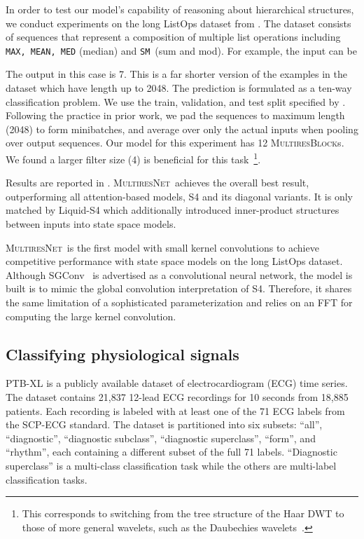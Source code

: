 \documentclass{article}
\theoremstyle{plain}
\theoremstyle{definition}
\theoremstyle{remark}
\newcommand{\ourmodel}{\textsc{MultiresNet}}
\begin{document}
In order to test our model's capability of reasoning about hierarchical structures, we conduct experiments on the long ListOps dataset from \citet{tay2021long}. 
The dataset consists of sequences that represent a composition of multiple list operations including \texttt{MAX, MEAN, MED} (median) and \texttt{SM}~(sum and mod). 
For example, the input can be

The output in this case is 7. 
This is a far shorter version of the examples in the dataset which have length up to 2048. 
The prediction is formulated as a ten-way classification problem. 
We use the train, validation, and test split specified by \citet{tay2021long}. 
Following the practice in prior work, we pad the sequences to maximum length (2048) to form minibatches, and average over only the actual inputs when pooling over output sequences. Our model for this experiment has 12 \textsc{MultiresBlock}s. 
We found a larger filter size (4) is beneficial for this task~\footnote{This corresponds to switching from the tree structure of the Haar DWT to those of more general wavelets, such as the Daubechies wavelets~\citep{akansu2001multiresolution}.}. 

Results are reported in . 
\ourmodel\ achieves the overall best result, outperforming all attention-based models, S4 and its diagonal variants. 
It is only matched by Liquid-S4 which additionally introduced inner-product structures between inputs into state space models. 

\ourmodel\ is the first model with small kernel convolutions to achieve competitive performance with state space models on the long ListOps dataset. 
Although SGConv~\citep{li2022makes} is advertised as a convolutional neural network, the model is built is to mimic the global convolution interpretation of S4. 
Therefore, it shares the same limitation of a sophisticated parameterization and relies on an FFT for computing the large kernel convolution. 




\subsection{Classifying physiological signals}
PTB-XL \citep{Wagner2020PTBXLLargePublicly} is a publicly available dataset of electrocardiogram (ECG) time series. The dataset contains 21,837 12-lead ECG recordings for 10 seconds from 18,885 patients.
Each recording is labeled with at least one of the 71 ECG labels from the SCP-ECG standard.
The dataset is partitioned into six subsets: ``all'', ``diagnostic'', ``diagnostic subclass'', ``diagnostic superclass'', ``form'', and ``rhythm'', each containing a different subset of the full 71 labels.
``Diagnostic superclass'' is a multi-class classification task while the others are multi-label classification tasks.
\end{document}

